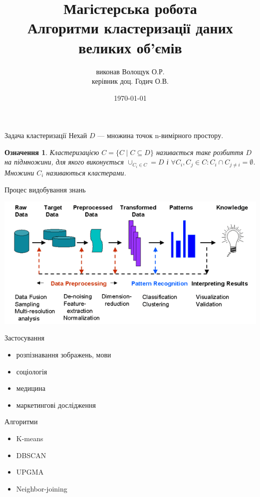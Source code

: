 \documentclass{beamer}
\title{Магістерська робота\\Алгоритми кластеризації даних великих об’ємів}
\author{виконав Волощук О.Р.\\керівник доц. Годич О.В.}
\date{\today}
\newtheorem{defn}{Означення}
\begin{document}
    \begin{frame}
        \maketitle
    \end{frame}

    \begin{frame}{Задача кластеризації}
        Нехай $D$ --- множина точок n-вимірного простору. 
        \begin{defn}
            \emph{Кластеризацією} $C = \{C \mid C \subseteq D\}$ називається таке розбиття $D$ на підмножини, 
            для якого виконується $\cup_{C_i \in C} = D$ і $\forall C_i, C_j \in C : C_i \cap C_{j \neq i} = \emptyset$. 
            Множини $C_i$ називаються кластерами.
        \end{defn}
    \end{frame}
    
    \begin{frame}{Процес видобування знань}
        \begin{center}
            \includegraphics[scale=0.5]{data_mining_steps.png}
        \end{center}
    \end{frame}    
    
    \begin{frame}{Застосування}
        \begin{itemize}
            \item розпізнавання зображень, мови
            \item соціологія
            \item медицина
            \item маркетингові дослідження
        \end{itemize}
    \end{frame}
    
    
    \begin{frame}{Алгоритми}
        \begin{itemize}
            \item K-means
            \item DBSCAN
            \item UPGMA
            \item Neighbor-joining
        \end{itemize}
    \end{frame}
    
\end{document}

